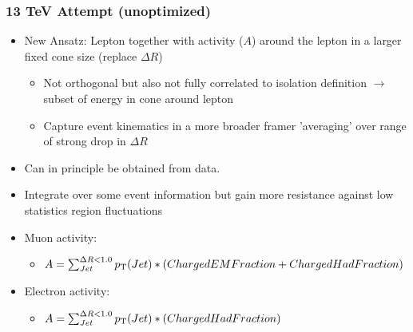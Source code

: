 \documentclass{beamer}
\begin{document}
\begin{frame}
 \frametitle{13 TeV Attempt (unoptimized)}
 \begin{itemize}
  \item New Ansatz: Lepton \pt together with activity ($A$) around the lepton in a larger fixed cone size (replace $\Delta R$)
 \begin{itemize}
  \item Not orthogonal but also not fully correlated to isolation definition $\rightarrow$ subset of energy in cone around lepton
 \item Capture event kinematics in a more broader framer 'averaging' over range of strong drop in $\Delta R$
 \end{itemize}
   \item Can in principle be obtained from data. %
   \item Integrate over some event information but gain more resistance against low statistics region fluctuations
  \item Muon activity:
  \begin{itemize}
   \item $A = \sum_{Jet}^{\Delta R<1.0} p_{\text{T}}(Jet) * (ChargedEMFraction + ChargedHadFraction) $
  \end{itemize}
    \item Electron activity:
  \begin{itemize}
   \item $A = \sum_{Jet}^{\Delta R<1.0} p_{\text{T}}(Jet) * (ChargedHadFraction) $
  \end{itemize}
 \end{itemize}

\end{frame}
\end{document}

